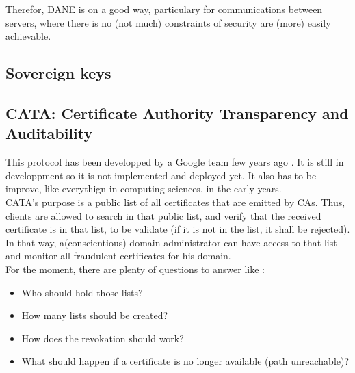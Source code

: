\documentclass[journal, a4paper]{IEEEtran}
\begin{document}
Therefor, DANE is on a good way, particulary for communications between servers, where there is no (not much) constraints of security are (more) easily achievable. 

\subsection{Sovereign keys}
\label{sovkeys}



\subsection{CATA: Certificate Authority Transparency and Auditability}
\label{certtrans}

This protocol has been developped by a Google team few years ago \cite{LL11}. It is still in developpment \cite{certtransp2013} so it is not implemented and deployed yet. It also has to be improve, like everythign in computing sciences, in the early years.\\
CATA's purpose is a public list of all certificates that are emitted by CAs. Thus, clients are allowed to search in that public list, and verify that the received certificate is in that list, to be validate (if it is not in the list, it shall be rejected).\\
In that way, a(conscientious) domain administrator can have access to that list and monitor all fraudulent certificates for his domain.\\
For the moment, there are plenty of questions to answer like :
\begin{itemize}
	\item Who should hold those lists?
	\item How many lists should be created?
	\item How does the revokation should work?
	\item What should happen if a certificate is no longer available (path unreachable)?
\end{itemize}

\nocite{*}
\end{document}
